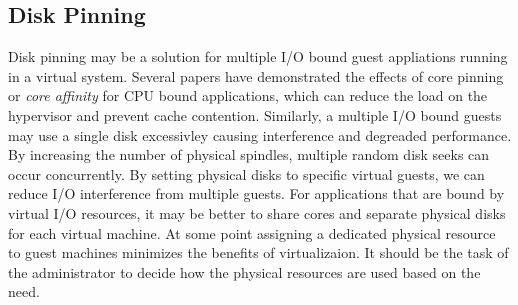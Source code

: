 \subsection{Disk Pinning}
Disk pinning may be a solution for multiple I/O bound guest appliations running in a virtual system.  Several papers have demonstrated the effects of core pinning or \emph{core affinity} for CPU bound applications, which can reduce the load on the hypervisor and prevent cache contention.  Similarly, a multiple I/O bound guests may use a single disk excessivley causing interference and degreaded performance.  By increasing the number of physical spindles, multiple random disk seeks can occur concurrently.  By setting physical disks to specific virtual guests, we can reduce I/O interference from multiple guests.  For applications that are bound by virtual I/O resources, it may be better to share cores and separate physical disks for each virtual machine.  At some point assigning a dedicated physical resource to guest machines minimizes the benefits of virtualizaion.  It should be the task of the administrator to decide how the physical resources are used based on the need.

